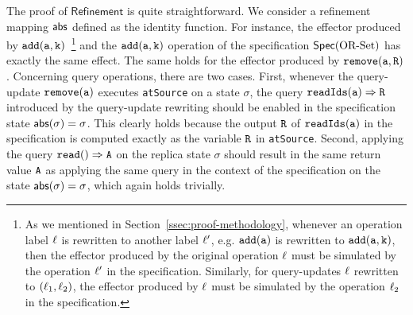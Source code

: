 The proof of $\mathsf{Refinement}$ is quite straightforward. We consider a refinement mapping $\mathsf{abs}$ defined as the identity function. For instance, the effector produced by $\alabelshort[{\tt add}]{a,k}$~\footnote{As we mentioned in Section~\ref{ssec:proof-methodology}, whenever an operation label $\ell$ is rewritten to another label $\ell'$, e.g. $\alabelshort[{\tt add}]{a}$ is rewritten to $\alabelshort[{\tt add}]{a,k}$, then the effector produced by the original operation $\ell$ must be simulated by the operation $\ell'$ in the specification. Similarly, for query-updates $\ell$ rewritten to $(\ell_1,\ell_2)$, the effector produced by $\ell$ must be simulated by the operation $\ell_2$ in the specification.} and the $\alabelshort[{\tt add}]{a,k}$ operation of the specification $\mathsf{Spec}(\text{OR\text{-}Set})$ has exactly the same effect. The same holds for the effector produced by $\alabelshort[{\tt remove}]{a,R}$. Concerning query operations, there are two cases. First, whenever the query-update $\alabelshort[{\tt remove}]{a}$ executes \lstinline|atSource| on a state $\sigma$, the query $\alabellong[{\tt readIds}]{a}{R}{}$ introduced by the query-update rewriting should be enabled in the specification state $\mathsf{abs}(\sigma)=\sigma$. This clearly holds because the output ${\tt R}$ of ${\tt readIds(a)}$ in the specification is computed exactly as the variable ${\tt R}$ in \lstinline|atSource|.
Second, applying the query $\alabellongind[{\tt read}]{}{A}{}$ on the replica state $\sigma$ should result in the same return value ${\tt A}$ as applying the same query in the context of the specification on the state $\mathsf{abs}(\sigma)=\sigma$, which again holds trivially.

